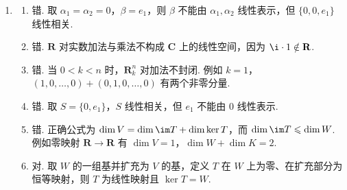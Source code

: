 \begin{enumerate}
    \item
    \begin{enumerate}
        \item 错. 取 $\alpha_1=\alpha_2=0$，$\beta=e_1$，则 $\beta$ 不能由 $\alpha_1,\alpha_2$ 线性表示，但 $\{0,0,e_1\}$ 线性相关.

        \item 错. $\mathbf{R}$ 对实数加法与乘法不构成 $\mathbf{C}$ 上的线性空间，因为 $\i\cdot 1\notin\mathbf{R}$.

        \item 错. 当 $0<k<n$ 时，$\mathbf{R}_k^n$ 对加法不封闭. 例如 $k=1$，$(1,0,\ldots,0)+(0,1,0,\ldots,0)$ 有两个非零分量.

        \item 错. 取 $S=\{0,e_1\}$，$S$ 线性相关，但 $e_1$ 不能由 $0$ 线性表示.

        \item 错. 正确公式为 $\dim V=\dim\im T+\dim\ker T$，而 $\dim\im T\leqslant\dim W$. 例如零映射 $\mathbf{R}\to\mathbf{R}$ 有 $\dim V=1$，$\dim W+\dim K=2$.

        \item 对. 取 $W$ 的一组基并扩充为 $V$ 的基，定义 $T$ 在 $W$ 上为零、在扩充部分为恒等映射，则 $T$ 为线性映射且 $\ker T=W$.
    \end{enumerate}
\end{enumerate}

\clearpage
